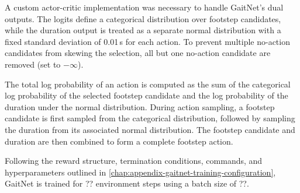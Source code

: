 A custom actor-critic implementation was necessary to handle
GaitNet's dual outputs. The logits define a categorical distribution
over footstep candidates, while the duration output is treated as a
separate normal distribution with a fixed standard deviation of
0.01\,s for each action. To prevent multiple no-action candidates
from skewing the selection, all but one no-action candidate are
removed (set to $-\infty$).

The total log probability of an action is computed as the sum of the
categorical log probability of the selected footstep candidate and
the log probability of the duration under the normal distribution.
During action sampling, a footstep candidate is first sampled from
the categorical distribution, followed by sampling the duration from
its associated normal distribution. The footstep candidate and
duration are then combined to form a complete footstep action.

Following the reward structure, termination conditions, commands, and
hyperparameters outlined in
\autoref{chap:appendix-gaitnet-training-configuration}, GaitNet is
trained for ?? environment steps using a batch size of ??.
